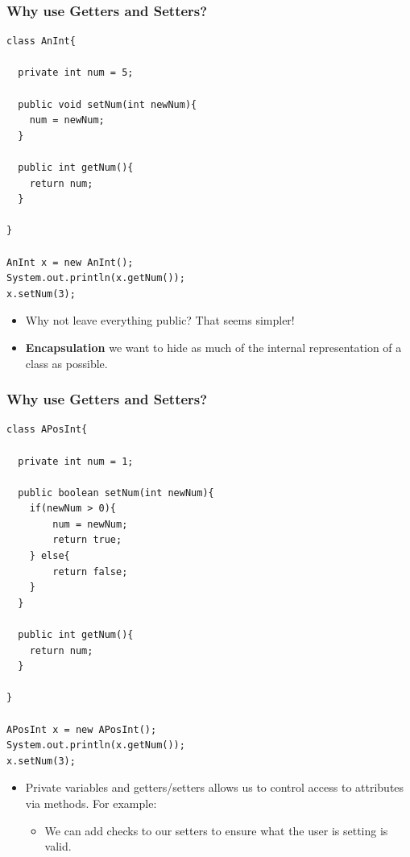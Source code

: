 \documentclass{beamer}
\begin{document}
\begin{frame}[fragile]
    \frametitle{Why use Getters and Setters?}
    \begin{minipage}{0.49\textwidth}
        \begin{lstlisting}[basicstyle=\tiny, frame=trBL]
class AnInt{
    
  private int num = 5;
    
  public void setNum(int newNum){
    num = newNum;
  }

  public int getNum(){
    return num;
  }

}

AnInt x = new AnInt();
System.out.println(x.getNum()); 
x.setNum(3);
        \end{lstlisting}
    \end{minipage}
    \begin{minipage}{0.49\textwidth}
        \begin{itemize}
            \item Why not leave everything public? That seems simpler!
            \item \textbf{Encapsulation} we want to hide as much of the internal representation of a class as possible.
        \end{itemize}
    \end{minipage}
\end{frame}

\begin{frame}[fragile]
    \frametitle{Why use Getters and Setters?}
    \begin{minipage}{0.49\textwidth}
        \begin{lstlisting}[basicstyle=\tiny, frame=trBL]
class APosInt{
    
  private int num = 1;
    
  public boolean setNum(int newNum){
    if(newNum > 0){
        num = newNum;
        return true;
    } else{
        return false;
    }   
  }

  public int getNum(){
    return num;
  }

}

APosInt x = new APosInt();
System.out.println(x.getNum()); 
x.setNum(3);
        \end{lstlisting}
    \end{minipage}
    \begin{minipage}{0.49\textwidth}
        \begin{itemize}
            \item Private variables and getters/setters allows us to control access to attributes via methods. For example:
            \begin{itemize}
                \item We can add checks to our setters to ensure what the user is setting is valid.
            \end{itemize}
        \end{itemize}
    \end{minipage}
\end{frame}
\end{document}

